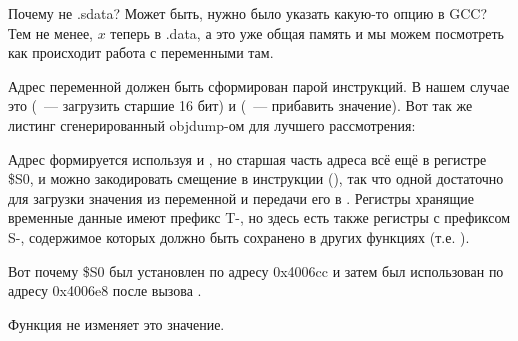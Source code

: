 Почему не .sdata? Может быть, нужно было указать какую-то опцию в GCC?
Тем не менее, $x$ теперь в .data, а это уже общая память и мы можем посмотреть как происходит
работа с переменными там.

Адрес переменной должен быть сформирован парой инструкций.
В нашем случае это  (~--- загрузить старшие 16 бит) и 
 (~--- прибавить значение).
Вот так же листинг сгенерированный objdump-ом для лучшего рассмотрения:



Адрес формируется используя  и , но старшая часть адреса
всё ещё в регистре \$S0, и можно закодировать смещение в инструкции  (), так что одной
 достаточно для загрузки значения из переменной и передачи его в \printf.
Регистры хранящие временные данные имеют префикс T-, но здесь есть также регистры с префиксом S-,
содержимое которых должно быть сохранено в других функциях (т.е. ).

Вот почему \$S0 был установлен по адресу 0x4006cc и затем был использован по адресу 0x4006e8
после вызова \scanf.

Функция \scanf не изменяет это значение.

